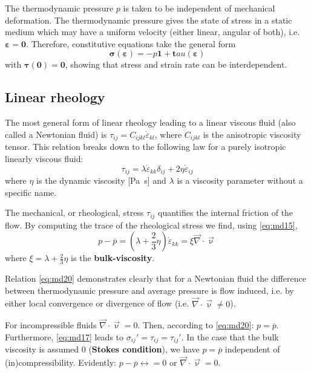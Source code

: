 The thermodynamic pressure $p$ is taken to be independent of mechanical deformation.
The thermodynamic pressure gives the state of stress in a static medium which may have
a uniform velocity (either linear, angular of both), i.e. ${\bm\varepsilon}={\bm 0}$. 
Therefore, constitutive equations take the general form
\begin{equation}
{\bm \sigma}({\bm\varepsilon}) = -p {\bm 1} + {\bm tau}({\bm\varepsilon})
\label{eq:md18}
\end{equation}
with ${\bm \tau}({\bm 0})={\bm 0}$, showing that stress and strain rate can be interdependent.

\subsection{Linear rheology}

The most general form of linear rheology leading to a linear viscous
fluid (also called a Newtonian fluid) is $\tau_{ij}=C_{ijkl} \dot{\varepsilon}_{kl}$, 
where $C_{ijkl}$ is the anisotropic viscosity tensor. 
This relation breaks down to the following law for a purely isotropic
linearly viscous fluid:
\begin{equation}
\tau_{ij} = \lambda \dot{\varepsilon}_{kk} \delta_{ij} + 2 \eta  \dot{\varepsilon}_{ij}
\label{eq:md19}
\end{equation}
where $\eta$ is the dynamic viscosity [\si{\pascal\second}] and $\lambda$ is a viscosity
parameter without a specific name.

The mechanical, or rheological, stress $\tau_{ij}$ quantifies the internal friction of the flow. By
computing the trace of the rheological stress we find, using \eqref{eq:md15},
\begin{equation}
p - \overline{p} = \left(\lambda + \frac23 \eta \right) \dot{\varepsilon}_{kk} 
= \xi \vec\nabla\cdot\vec\upnu
\label{eq:md20}
\end{equation}
where $\xi=\lambda + \frac23 \eta$ is the {\bf bulk-viscosity}.

Relation \eqref{eq:md20} demonstrates clearly that for a Newtonian fluid the difference between
thermodynamic pressure and average pressure is flow induced, i.e. by either local
convergence or divergence of flow (i.e. $\vec\nabla\cdot \vec\upnu \neq 0$).

For incompressible fluids $\vec\nabla\cdot \vec\upnu = 0$. 
Then, according to \eqref{eq:md20}: $p = \overline{p}$. Furthermore, \eqref{eq:md17}
leads to $\sigma_{ij}'=\tau_{ij}=\tau_{ij}'$. In the case that the bulk viscosity 
is assumed 0 ({\bf Stokes condition}), we have $p = \overline{p}$ 
independent of (in)compressibility. Evidently: $p - \overline{p} \longleftrightarrow =0$
or $\vec\nabla \cdot \vec\upnu= 0$.


